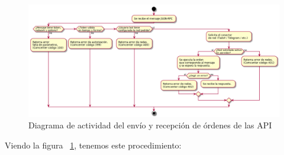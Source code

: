\documentclass[spanish,12pt, a4paper, twoside]{paper}
\begin{document}
\begin{figure}
\centering
	\includegraphics[width=\textwidth]{recursos/activity}
\caption{Diagrama de actividad del envío y recepción de órdenes de las API}
\label{fig:DActividad envío recepción órdenes}
\end{figure}

Viendo la figura ~\ref{fig:DActividad envío recepción órdenes}, tenemos este procedimiento:
\end{document}
